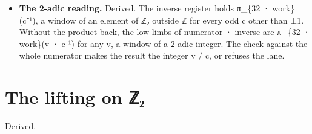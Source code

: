 \begin{itemize}
\begin{itemize}
\item It shifts the numerator and the divisor past the divisor's low zero bits.
\item It grows the odd part's inverse modulo 2\textasciicircum{}\{32 · work\} by Newton's x ← x(2 − cx) from one word, where work is the larger of the numerator's limbs and the quotient's.
\item Newton converges 2-adically. An odd c = 2m + 1 has c² = 4m(m + 1) + 1 ≡ 1 mod 8: it is its own inverse to 3 bits. If cx ≡ 1 mod 2\textasciicircum{}b, then c · x(2 − cx) = 1 − (1 − cx)² ≡ 1 mod 2\textasciicircum{}\{2b\}. In one word, four rounds give 6, 12, 24 and 48 bits, past the word's 32. The stored limbs then double each round up to work.
\item The quotient is the low limbs of numerator · inverse, and the product back against the whole numerator proves it.
\end{itemize}
\item \textbf{The 2-adic reading.} Derived. The inverse register holds π\_\allowbreak{}\{32 · work\}(c⁻¹), a window of an element of ℤ₂ outside ℤ for every odd c other than ±1. Without the product back, the low limbs of numerator · inverse are π\_\allowbreak{}\{32 · work\}(v · c⁻¹) for any v, a window of a 2-adic integer. The check against the whole numerator makes the result the integer v / c, or refuses the lane.
\end{itemize}

\section{\texorpdfstring{The lifting on ℤ₂}{The lifting on ℤ₂}}

Derived.

